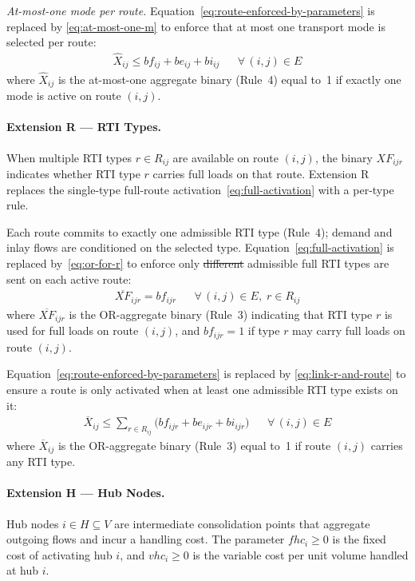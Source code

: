 \noindent\textit{{At-most-one mode per route.}}
Equation~\eqref{eq:route-enforced-by-parameters} is replaced by
\eqref{eq:at-most-one-m} to enforce {that at most one
transport mode is selected per route:}
\begin{align}
  \widehat{X}_{ij} \leq bf_{ij}+be_{ij}+bi_{ij}
  && {\forall\,(i,j)\in E}
  \label{eq:at-most-one-m}
\end{align}
{where $\widehat{X}_{ij}$ is the at-most-one aggregate binary
(Rule~4) equal to~1 if exactly one mode is active on route $(i,j)$.}

\paragraph{Extension R --- RTI Types.}
{When multiple RTI types $r \in R_{ij}$ are available on
route $(i,j)$, the binary $XF_{ijr}$ indicates whether RTI type $r$ carries
full loads on that route.  Extension R replaces the single-type full-route
activation~\eqref{eq:full-activation} with a per-type rule.}

Each route commits to exactly one admissible RTI type (Rule~4); demand and
inlay flows are conditioned on the selected type.
Equation~\eqref{eq:full-activation} is replaced by~\eqref{eq:or-for-r} to
enforce only {\sout{different}}
{admissible} full RTI types {are sent on each active route:}
%
\begin{align}
  \overline{XF}_{ijr} = bf_{ijr}
  && \forall\,(i,j)\in E,\;{r \in R_{ij}}
  \label{eq:or-for-r}
\end{align}
%
{where $\overline{XF}_{ijr}$ is the OR-aggregate binary
(Rule~3) indicating that RTI type $r$ is used for full loads on route
$(i,j)$, and $bf_{ijr}=1$ if type $r$ may carry full loads on route
$(i,j)$.}

Equation~\eqref{eq:route-enforced-by-parameters} is replaced by
\eqref{eq:link-r-and-route}  {to ensure a route is only
activated when at least one admissible RTI type exists on it:}
\begin{align}
  \overline{X}_{ij} \leq \sum_{r\in R_{ij}} \bigl(bf_{ijr}+be_{ijr}+bi_{ijr}\bigr)
  && {\forall\,(i,j)\in E}
  \label{eq:link-r-and-route}
\end{align}
{where $\overline{X}_{ij}$ is the OR-aggregate binary
(Rule~3) equal to~1 if route $(i,j)$ carries any RTI type.}

\paragraph{Extension H --- Hub Nodes.}
{Hub nodes $i \in H \subseteq V$ are intermediate
consolidation points that aggregate outgoing flows and incur a handling cost.
The parameter $fhc_i \geq 0$ is the fixed cost of activating hub $i$, and
$vhc_i \geq 0$ is the variable cost per unit volume handled at hub $i$.}

